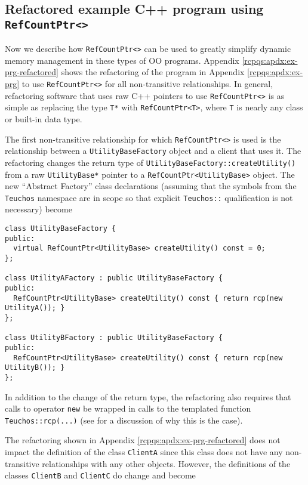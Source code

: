 \documentclass[pdf,ps2pdf,11pt]{SANDreport}
\begin{document}
%
\subsection{Refactored example C++ program using {}\texttt{Ref\-Count\-Ptr<>}}
\label{rcpbg:sec:refactored-program}
%

Now we describe how {}\texttt{Ref\-Count\-Ptr<>} can be used to
greatly simplify dynamic memory management in these types of OO
programs.  Appendix {}\ref{rcpqs:apdx:ex-prg-refactored} shows the
refactoring of the program in Appendix {}\ref{rcpqs:apdx:ex-prg} to
use {}\texttt{Ref\-Count\-Ptr<>} for all non-transitive relationships.
In general, refactoring software that uses raw C++ pointers to use
{}\texttt{Ref\-Count\-Ptr<>} is as simple as replacing the type
{}\texttt{T*} with {}\texttt{Ref\-Count\-Ptr<T>}, where {}\texttt{T}
is nearly any class or built-in data type.

The first non-transitive relationship for which
{}\texttt{Ref\-Count\-Ptr<>} is used is the relationship between a
{}\texttt{Utility\-Base\-Factory} object and a client that uses it.
The refactoring changes the return type of
{}\texttt{Utility\-Base\-Factory\-::createUtility()} from a raw
{}\texttt{Utility\-Base*} pointer to a
{}\texttt{Ref\-Count\-Ptr<Utility\-Base>} object.  The new ``Abstract
Factory'' class declarations (assuming that the symbols from the
{}\texttt{Teuchos} namespace are in scope so that explicit
{}\texttt{Teuchos::} qualification is not necessary) become

{\small\begin{verbatim}
class UtilityBaseFactory {
public:
  virtual RefCountPtr<UtilityBase> createUtility() const = 0;
};

class UtilityAFactory : public UtilityBaseFactory {
public:
  RefCountPtr<UtilityBase> createUtility() const { return rcp(new UtilityA()); }
};

class UtilityBFactory : public UtilityBaseFactory {
public:
  RefCountPtr<UtilityBase> createUtility() const { return rcp(new UtilityB()); }
};
\end{verbatim}}

In addition to the change of the return type, the refactoring also
requires that calls to operator {}\texttt{new} be wrapped in calls to
the templated function {}\texttt{Teuchos\-::rcp(...)} (see
{}\cite[Appendix C]{ref:RefCountPtr} for a discussion of why this is
the case).

The refactoring shown in Appendix {}\ref{rcpqs:apdx:ex-prg-refactored}
does not impact the definition of the class {}\texttt{ClientA} since
this class does not have any non-transitive relationships with any
other objects.  However, the definitions of the classes
{}\texttt{ClientB} and {}\texttt{ClientC} do change and become
\end{document}
